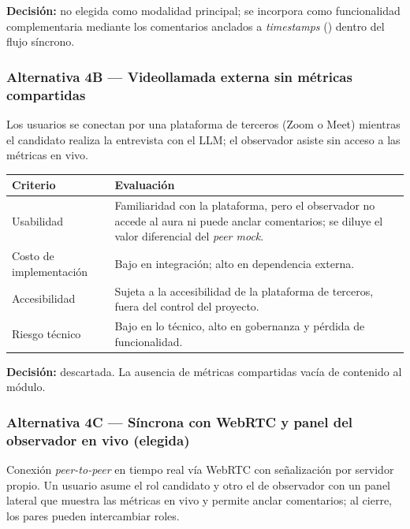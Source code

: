 \noindent\textbf{Decisión:} no elegida como modalidad principal; se
incorpora como funcionalidad complementaria mediante los comentarios
anclados a \textit{timestamps} () dentro del flujo síncrono.

\subsubsection*{Alternativa 4B — Videollamada externa sin métricas compartidas}
Los usuarios se conectan por una plataforma de terceros (Zoom o Meet)
mientras el candidato realiza la entrevista con el LLM; el observador
asiste sin acceso a las métricas en vivo.

\begin{table}[ht]
\centering\footnotesize
\renewcommand{\arraystretch}{1.2}
\begin{tabularx}{\linewidth}{@{}p{3.6cm} Y@{}}
\toprule
\textbf{Criterio} & \textbf{Evaluación} \\
\midrule
Usabilidad & Familiaridad con la plataforma, pero el observador no
accede al aura ni puede anclar comentarios; se diluye el valor
diferencial del \textit{peer mock}. \\
Costo de implementación & Bajo en integración; alto en dependencia
externa. \\
Accesibilidad & Sujeta a la accesibilidad de la plataforma de
terceros, fuera del control del proyecto. \\
Riesgo técnico & Bajo en lo técnico, alto en gobernanza y pérdida de
funcionalidad. \\
\bottomrule
\end{tabularx}
\end{table}

\noindent\textbf{Decisión:} descartada. La ausencia de métricas
compartidas vacía de contenido al módulo.

\subsubsection*{Alternativa 4C — Síncrona con WebRTC y panel del observador en vivo (elegida)}
Conexión \textit{peer-to-peer} en tiempo real vía WebRTC con
señalización por servidor propio. Un usuario asume el rol candidato y
otro el de observador con un panel lateral que muestra las métricas
en vivo y permite anclar comentarios; al cierre, los pares pueden
intercambiar roles.

